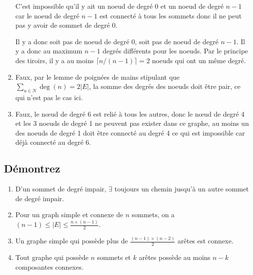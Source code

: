 \begin{solution}
\begin{enumerate}
      C'est impossible qu'il y ait un noeud de degré 0 et
      un noeud de degré $n-1$ car le noeud de degré $n-1$ est connecté
      à tous les sommets donc il ne peut pas y avoir de sommet de degré 0.

      Il y a donc soit pas de noeud de degré 0,
      soit pas de noeud de degré $n-1$.
      Il y a donc au maximum $n-1$ degrés différents pour les noeuds.
      Par le principe des tiroirs, il y a au moins
      $\lceil n / (n-1) \rceil = 2$ noeuds qui ont un même degré.
    \item Faux, par le lemme de poignées de mains stipulant que $\sum_{u \in N} \deg(n) = 2|E|$,
      la somme des degrés des noeuds doit être pair, ce qui n'est pas le cas ici.
    \item Faux, le nœud de degré 6 est relié à tous les autres,
      donc le nœud de degré 4 et les 3 noeuds de degré 1 ne peuvent pas exister dans ce graphe,
      au moins un des noeuds de degré 1 doit être connecté au degré 4 ce qui est impossible car déjà connecté au degré 6.
  \end{enumerate}
\end{solution}

\subsection{Démontrez}
\begin{enumerate}
  \item D'un sommet de degré impair, $\exists$ toujours un chemin jusqu'à un autre sommet de degré impair.
  \item Pour un graph simple et connexe de $n$ sommets, on a $(n-1) \leq |E| \leq \frac{n \times (n-1)}{2}$.
  \item Un graphe simple qui possède plus de $\frac{(n-1) \times (n-2)}{2}$ arêtes est connexe.
  \item Tout graphe qui possède $n$ sommets et $k$ arêtes possède au moins $n-k$ composantes connexes.
\end{enumerate}

